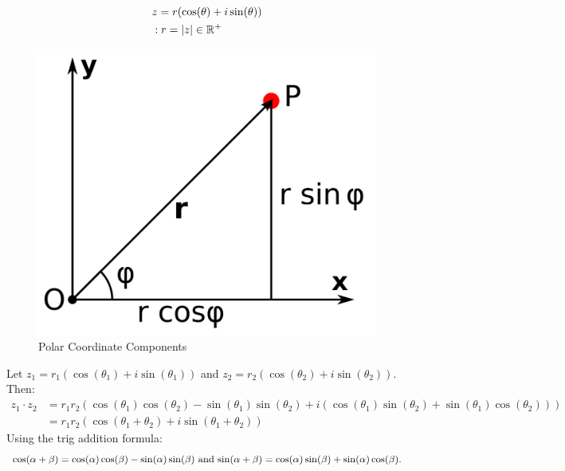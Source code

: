 \begin{definition}
    \begin{align}
         & z = r(\cos(\theta) + i\sin(\theta)) \label{polar} \\
         & : r = |z| \in \mathbb{R}^+ \notag
        \label{polar form}
    \end{align}
\end{definition}

\begin{figure}[htbp]
    \centering
    \includegraphics[scale = 0.2]{./LECTURE_1/Polar_coordinate_components.png}
    \caption{Polar Coordinate Components}
    \label{fig:polar}
\end{figure}

\begin{example}
    Let $z_1 = r_1(\cos(\theta_1) + i\sin(\theta_1))$ and $z_2 = r_2(\cos(\theta_2) + i\sin(\theta_2))$. Then:
    \begin{align}
        z_1 \cdot z_2 & = r_1r_2(\cos(\theta_1)\cos(\theta_2) - \sin(\theta_1)\sin(\theta_2) + i(\cos(\theta_1)\sin(\theta_2) + \sin(\theta_1)\cos(\theta_2))) \\
                      & = r_1r_2(\cos(\theta_1 + \theta_2) + i\sin(\theta_1 + \theta_2))
        \label{polar product}
    \end{align}
    Using the trig addition formula:
    \[\cos(\alpha + \beta) = \cos(\alpha)\cos(\beta) - \sin(\alpha)\sin(\beta)$ and $\sin(\alpha + \beta) = \cos(\alpha)\sin(\beta) + \sin(\alpha)\cos(\beta).\]
\end{example}

